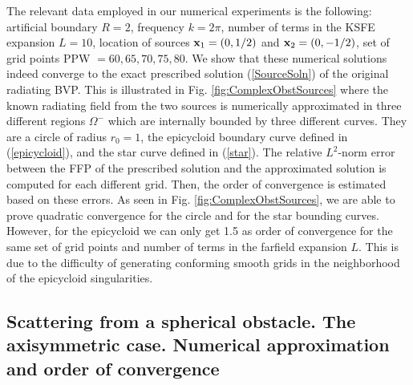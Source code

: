 \documentclass[final,3p,times,12pt]{elsarticle}
\begin{document}
The relevant data employed in our numerical experiments is the following: artificial boundary $R=2$, frequency $k=2\pi$, number of terms in the KSFE expansion $L=10$, location of sources ${\bf x}_1 =(0,1/2)$ and ${\bf x}_2 =(0,-1/2)$, set of grid points PPW $= 60, 65, 70, 75, 80$.
We show that these numerical solutions indeed converge to the exact prescribed solution (\ref{SourceSoln}) of the original radiating BVP. 
This is illustrated in Fig. \ref{fig:ComplexObstSources}
where the known radiating field from the two sources is numerically approximated in three different regions $\Omega^{-}$ which are internally bounded by three different curves. They are a circle of radius $r_0=1$, the epicycloid boundary curve defined in (\ref{epicycloid}), and the star curve defined in (\ref{star}).  The relative $L^2$-norm error between the FFP of the prescribed solution and the approximated solution is computed for each different grid. Then, the order of convergence is estimated based on these errors.
As seen in Fig. \ref{fig:ComplexObstSources}, we are able to prove quadratic convergence for the circle and for the star bounding curves. However, for the epicycloid we can only get 1.5 as order of convergence for the same set of grid points and number of terms in the farfield expansion $L$. This is due to the difficulty of generating conforming smooth grids in the neighborhood of the epicycloid singularities.

\subsection{Scattering from a spherical obstacle. The axisymmetric case. Numerical approximation and order of convergence}
\label{orderconverg3D}
\end{document}

